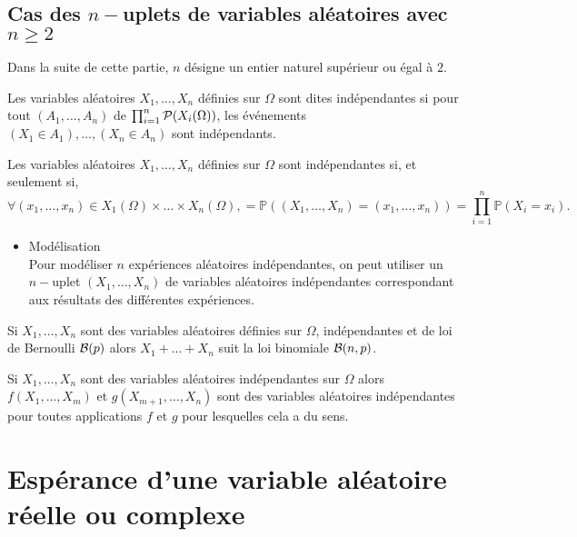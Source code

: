 \subsection{Cas des \(n-\)uplets de variables aléatoires avec \(n \geq 2\)}
    Dans la suite de cette partie, \(n\) désigne un entier naturel supérieur ou égal à \(2\).
\begin{defi}
    Les variables aléatoires \(X_1, \dots , X_n\) définies sur \(\Omega\) sont dites indépendantes si pour tout \((A_1, \dots , A_n)\) de \(\prod^n_{i=1} \cal{P} (X_i(\Omega))\), les événements \((X_1 \in  A_1), \dots , (X_n \in  A_n)\) sont indépendants.
\end{defi}
\begin{defprop}[Caractérisation]
    Les variables aléatoires \(X_1, \dots , X_n\) définies sur \(\Omega\) sont indépendantes si, et seulement si, 
    \[\forall (x_1, \dots , x_n) \in  X_1(\Omega) \times \dots \times X_n(\Omega), = \mathbb{P} ((X_1, \dots , X_n) = (x_1, \dots , x_n)) = \prod^n_{i=1} \mathbb{P}(X_i = x_i).\]
    \begin{itemize}
        \item Modélisation\\
        Pour modéliser \(n\) expériences aléatoires indépendantes, on peut utiliser un \(n-\)uplet \((X_1, \dots , X_n)\) de variables aléatoires indépendantes correspondant aux résultats des différentes expériences.
    \end{itemize}
\end{defprop}
\begin{defprop}
    Si \(X_1, \dots , X_n\) sont des variables aléatoires définies sur \(\Omega\), indépendantes et de loi de Bernoulli \(\cal{B}(p)\) alors \(X_1 + \dots + X_n\) suit la loi binomiale \(\cal{B}(n, p)\).
\end{defprop}
\begin{defprop}
    Si \(X_1, \dots , X_n\) sont des variables aléatoires indépendantes sur \(\Omega\) alors \(f (X_1, \dots , X_m)\) et \(g (X_{m+1}, \dots , X_n)\) sont des variables aléatoires indépendantes pour toutes applications \(f\) et \(g\) pour lesquelles cela a du sens.
\end{defprop}

\section{Espérance d’une variable aléatoire réelle ou complexe}
